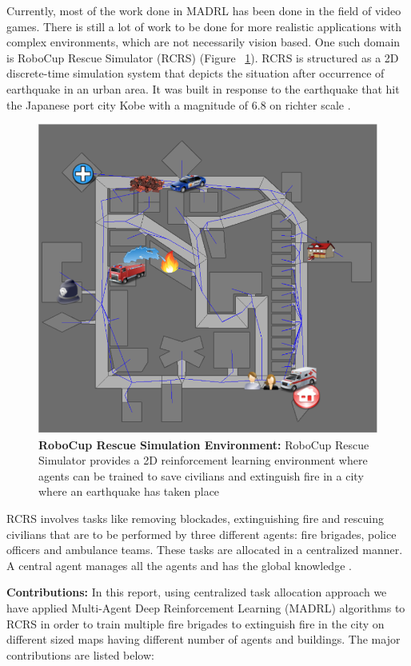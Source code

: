 \documentclass[12pt]{report}
\begin{document}
Currently, most of the work done in MADRL has been done in the field of video games. There is still a lot of work to be done for more realistic applications with complex environments, which are not necessarily vision based. One such domain is RoboCup Rescue Simulator (RCRS) (Figure ~\ref{fig:10}). RCRS is structured as a 2D discrete-time simulation system that depicts the situation after occurrence of earthquake in an urban area. It was built in response to the earthquake that hit the Japanese port city Kobe with a magnitude of 6.8 on richter scale \cite{Bilski} \cite{RoboCup}.

\begin{figure}[!h]
    \centering
    \includegraphics[width=12cm]{10.png}
    \caption{\textbf{RoboCup Rescue Simulation Environment:} RoboCup Rescue Simulator provides a 2D reinforcement learning environment where agents can be trained to save civilians and extinguish fire in a city where an earthquake has taken place}
    \label{fig:10}
\end{figure}

RCRS involves tasks like removing blockades, extinguishing fire and rescuing civilians that are to be performed by three different agents: fire brigades, police officers and ambulance teams. These tasks are allocated in a centralized manner. A central agent manages all the agents and has the global knowledge \cite{Nair}. 

\textbf{Contributions:} In this report, using centralized task allocation approach we have applied Multi-Agent Deep Reinforcement Learning (MADRL) algorithms to RCRS in order to train multiple fire brigades to extinguish fire in the city on different sized maps having different number of agents and buildings. The major contributions are listed below: 
\end{document}
